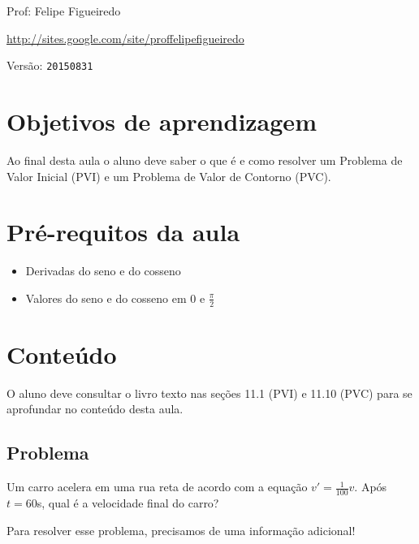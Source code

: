 \documentclass[a4paper]{article}
\begin{document}
\parbox[c]{.825\textwidth}{\raggedright%
{Prof: Felipe Figueiredo\par}
{\url{http://sites.google.com/site/proffelipefigueiredo}\par}
}

Versão: \verb|20150831|



\section{Objetivos de aprendizagem}

Ao final desta aula o aluno deve saber o que é e como resolver um
Problema de Valor Inicial (PVI) e um Problema de Valor de Contorno
(PVC).


\section{Pré-requitos da aula}

\begin{itemize}
\item Derivadas do seno e do cosseno
\item Valores do seno e do cosseno em $0$ e $\frac{\pi}{2}$
\end{itemize}

\section{Conteúdo}

O aluno deve consultar o livro texto nas seções 11.1 (PVI) e 11.10 (PVC)
para se aprofundar no conteúdo desta aula.

\subsection{Problema}

Um carro acelera em uma rua reta de acordo com a equação
$v'=\frac{1}{100}v$. Após $t=60$s, qual é a velocidade final do carro?

Para resolver esse problema, precisamos de uma informação adicional!
\end{document}
